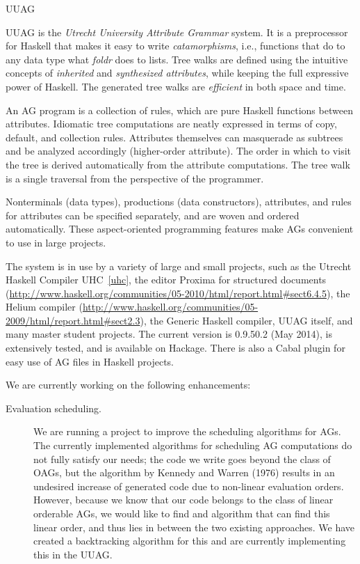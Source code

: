 \begin{hcarentry}[updated]{UUAG}
\label{uuag}
\makeheader

UUAG is the \emph{Utrecht University Attribute Grammar} system. It is a preprocessor for Haskell
that makes it easy to write \emph{catamorphisms}, i.e., functions that do to any data type what
\emph{foldr} does to lists. Tree walks are defined using the intuitive concepts of
\emph{inherited} and \emph{synthesized attributes}, while keeping the full expressive power
of Haskell. The generated tree walks are \emph{efficient} in both space and time.

An AG program is a collection of rules, which are pure Haskell functions between attributes.
Idiomatic tree computations are neatly expressed in terms of copy, default, and collection rules.
Attributes themselves can masquerade as subtrees and be analyzed accordingly (higher-order attribute). The order in which to visit the tree is derived automatically from the attribute computations. The tree walk is a single traversal from the perspective of the programmer.

Nonterminals (data types), productions (data constructors), attributes, and rules for attributes can be specified separately, and are woven and ordered automatically. These aspect-oriented programming features make AGs convenient to use in large projects.

The system is in use by a variety of large and small projects, such as the Utrecht Haskell Compiler UHC~\cref{uhc}, the editor Proxima for structured documents (\url{http://www.haskell.org/communities/05-2010/html/report.html#sect6.4.5}), the Helium compiler (\url{http://www.haskell.org/communities/05-2009/html/report.html#sect2.3}), the Generic Haskell compiler, UUAG itself, and many master student projects.
The current version is 0.9.50.2 (May 2014), is extensively tested, and is available on Hackage. There is also a Cabal plugin for easy use of AG files in Haskell projects.

We are currently working on the following enhancements:
\begin{description}
\item[Evaluation scheduling.]
  We are running a project to improve the scheduling algorithms for AGs. The currently implemented algorithms for scheduling AG computations do not fully satisfy our needs; the code we write goes beyond the class of OAGs, but the algorithm by Kennedy and Warren (1976) results in an undesired increase of generated code due to non-linear evaluation orders. However, because we know that our code belongs to the class of linear orderable AGs, we would like to find and algorithm that can find this linear order, and thus lies in between the two existing approaches. We have created a backtracking algorithm for this and are currently implementing this in the UUAG.


\end{description}
\end{hcarentry}
